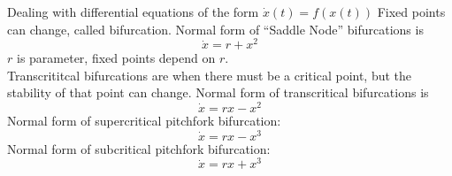 \documentclass{article}
\date{Winter Semester 2022}
\author{\EC}
\begin{document}
\maketitle
Dealing with differential equations of the form $\dot{x}(t)=f(x(t))$
Fixed points can change, called bifurcation. Normal form of ``Saddle Node'' bifurcations is $$\dot{x}=r+x^2$$
$r$ is parameter, fixed points depend on $r$.
\\
Transcrititcal bifurcations are when there must be a critical point, but the stability of that point can change. Normal form of transcritical bifurcations is 
$$\dot{x}=rx-x^2$$
Normal form of supercritical pitchfork bifurcation: 
$$\dot{x}=rx-x^3$$
Normal form of subcritical pitchfork bifurcation:
$$\dot{x}=rx+x^3$$
\end{document}
